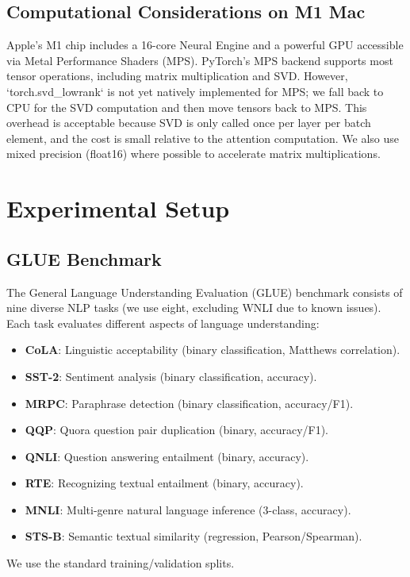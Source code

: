 \documentclass[twocolumn]{article}
\begin{document}
\subsection{Computational Considerations on M1 Mac}
Apple's M1 chip includes a 16-core Neural Engine and a powerful GPU accessible via Metal Performance Shaders (MPS). PyTorch's MPS backend supports most tensor operations, including matrix multiplication and SVD. However, `torch.svd\_lowrank` is not yet natively implemented for MPS; we fall back to CPU for the SVD computation and then move tensors back to MPS. This overhead is acceptable because SVD is only called once per layer per batch element, and the cost is small relative to the attention computation. We also use mixed precision (float16) where possible to accelerate matrix multiplications.

\section{Experimental Setup}
\subsection{GLUE Benchmark}
The General Language Understanding Evaluation (GLUE) benchmark \cite{wang2018glue} consists of nine diverse NLP tasks (we use eight, excluding WNLI due to known issues). Each task evaluates different aspects of language understanding:
\begin{itemize}
    \item \textbf{CoLA}: Linguistic acceptability (binary classification, Matthews correlation).
    \item \textbf{SST-2}: Sentiment analysis (binary classification, accuracy).
    \item \textbf{MRPC}: Paraphrase detection (binary classification, accuracy/F1).
    \item \textbf{QQP}: Quora question pair duplication (binary, accuracy/F1).
    \item \textbf{QNLI}: Question answering entailment (binary, accuracy).
    \item \textbf{RTE}: Recognizing textual entailment (binary, accuracy).
    \item \textbf{MNLI}: Multi-genre natural language inference (3-class, accuracy).
    \item \textbf{STS-B}: Semantic textual similarity (regression, Pearson/Spearman).
\end{itemize}
We use the standard training/validation splits.
\end{document}
